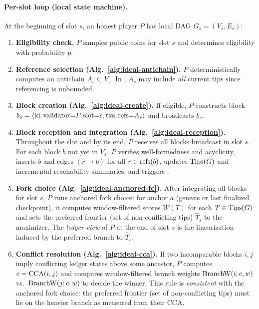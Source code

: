 \paragraph{Per-slot loop (local state machine).}
At the beginning of slot $s$, an honest player $P$ has local DAG $G_s=(V_s,E_s)$:
\begin{enumerate}
  \item \textbf{Eligibility check.} $P$ samples public coins for slot $s$ and determines eligibility with probability $p$. %
  \item \textbf{Reference selection (Alg.~\ref{alg:ideal-antichain}).} $P$ deterministically computes an antichain $A_s\subseteq V_s$. In \ProjIdeal, $A_s$ may include \emph{all} current tips since referencing is unbounded.
  \item \textbf{Block creation (Alg.~\ref{alg:ideal-create}).} If eligible, $P$ constructs block $b_s=\langle \mathrm{id},\mathrm{validator}{=}P,\mathrm{slot}{=}s,\mathrm{txs},\mathrm{refs}{=}A_s\rangle$ and broadcasts $b_s$.
  \item \textbf{Block reception and integration (Alg.~\ref{alg:ideal-reception}).} Throughout the slot and by its end, $P$ receives all blocks broadcast in slot $s$. For each block $b$ not yet in $V_s$, $P$ verifies well-formedness and acyclicity, inserts $b$ and edges $(r\to b)$ for all $r\in\mathrm{refs}(b)$, updates $\mathrm{Tips}(G)$ and incremental reachability summaries, and triggers \ForkChoiceUpdate.
  \item \textbf{Fork choice (Alg.~\ref{alg:ideal-anchored-fc}).} After integrating all blocks for slot $s$, $P$ runs anchored fork choice: for anchor $a$ (genesis or last finalized checkpoint), it computes window-filtered scores $W(T)$ for each $T\in\mathrm{Tips}(G)$ and sets the preferred frontier (set of non-conflicting tips) $\hat{T}_s$ to the maximizer. The \emph{ledger view} of $P$ at the end of slot $s$ is the linearization induced by the preferred branch to $\hat{T}_s$.
  \item \textbf{Conflict resolution (Alg.~\ref{alg:ideal-cca}).} If two incomparable blocks $i,j$ imply conflicting ledger states above some ancestor, $P$ computes $c=\mathrm{CCA}(i,j)$ and compares window-filtered branch weights $\mathrm{BranchW}(i;c,w)$ vs.\ $\mathrm{BranchW}(j;c,w)$ to decide the winner. This rule is \emph{consistent} with the anchored fork choice: the preferred frontier (set of non-conflicting tips) must lie on the heavier branch as measured from their CCA.
\end{enumerate}



